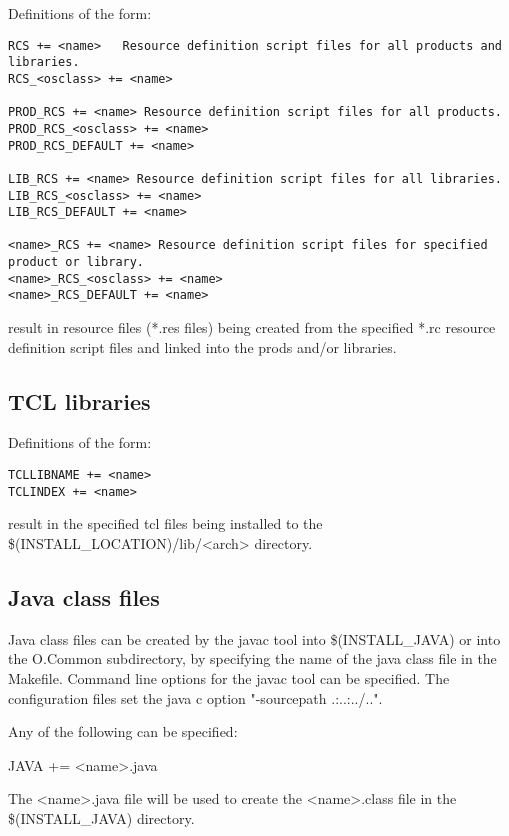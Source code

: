 Definitions of the form:

\begin{verbatim}RCS += <name>   Resource definition script files for all products and libraries.
RCS_<osclass> += <name>

PROD_RCS += <name> Resource definition script files for all products.
PROD_RCS_<osclass> += <name>
PROD_RCS_DEFAULT += <name>

LIB_RCS += <name> Resource definition script files for all libraries.
LIB_RCS_<osclass> += <name>
LIB_RCS_DEFAULT += <name>

<name>_RCS += <name> Resource definition script files for specified product or library.
<name>_RCS_<osclass> += <name>
<name>_RCS_DEFAULT += <name>

\end{verbatim}
result in resource files (*.res files) being created from the specified *.rc resource definition script files and linked into the 
prods and/or libraries.

\subsection{TCL libraries}

Definitions of the form:

\begin{verbatim}TCLLIBNAME += <name>
TCLINDEX += <name>
\end{verbatim}
result in the specified tcl files being installed to the \$(INSTALL\_LOCATION)/lib/\textless{}arch\textgreater{} directory.

\subsection{Java class files}

Java class files can be created by the javac tool into \$(INSTALL\_JAVA) or into the O.Common subdirectory, by 
specifying the name of the java class file in the Makefile. Command line options for the javac tool can be specified. The 
configuration files set the java c option "-sourcepath .:..:../..".

Any of the following can be specified:

\begin{description}\item {}JAVA += \textless{}name\textgreater{}.java

\end{description}The \textless{}name\textgreater{}.java file will be used to create the \textless{}name\textgreater{}.class file in the \$(INSTALL\_JAVA) directory.

